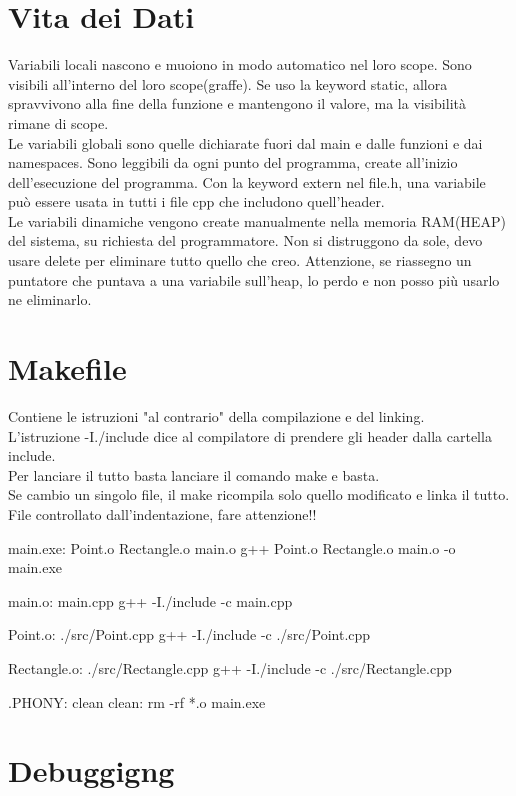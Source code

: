 \chapter{Vita dei Dati}
Variabili locali nascono e muoiono in modo automatico nel loro scope. Sono visibili all'interno del loro scope(graffe). Se uso la keyword static, allora spravvivono alla fine della funzione e mantengono il valore, ma la visibilità rimane di scope. \\
Le variabili globali sono quelle dichiarate fuori dal main e dalle funzioni e dai namespaces. Sono leggibili da ogni punto del programma, create all'inizio dell'esecuzione del programma. Con la keyword extern nel file.h, una variabile può essere usata in tutti i file cpp che includono quell'header.\\
Le variabili dinamiche vengono create manualmente nella memoria RAM(HEAP) del sistema, su richiesta del programmatore. Non si distruggono da sole, devo usare delete per eliminare tutto quello che creo. Attenzione, se riassegno un puntatore che puntava a una variabile sull'heap, lo perdo e non posso più usarlo ne eliminarlo.

\chapter{Makefile}
Contiene le istruzioni "al contrario" della compilazione e del linking.\\
L'istruzione -I./include dice al compilatore di prendere gli header dalla cartella include.\\
Per lanciare il tutto basta lanciare il comando make e basta.\\
Se cambio un singolo file, il make ricompila solo quello modificato e linka il tutto.\\
File controllato dall'indentazione, fare attenzione!!

\begin{cpp}
main.exe: Point.o Rectangle.o main.o
	g++ Point.o Rectangle.o main.o -o main.exe

main.o: main.cpp
	g++ -I./include -c main.cpp

Point.o: ./src/Point.cpp
	g++ -I./include -c ./src/Point.cpp

Rectangle.o: ./src/Rectangle.cpp
	g++ -I./include -c ./src/Rectangle.cpp

.PHONY: clean
clean:
	rm -rf *.o main.exe
\end{cpp}

\chapter{Debuggigng}

